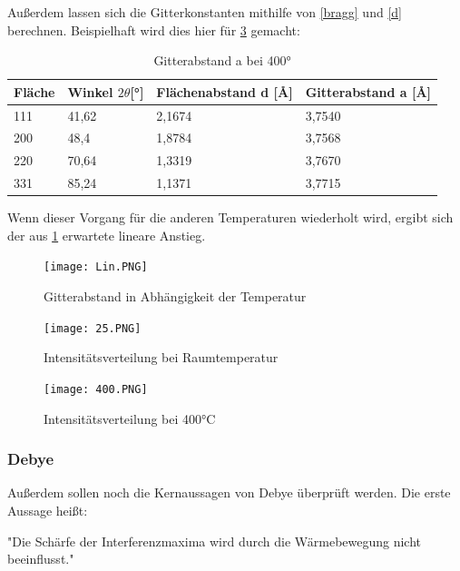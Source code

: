 \documentclass[
	a4paper,
	12pt,
	pagesize,
	ngerman
]{scrartcl}
\begin{document}
Außerdem lassen sich die Gitterkonstanten mithilfe von \cref{bragg} und \cref{d} berechnen. Beispielhaft wird dies hier für \cref{400} gemacht:
\begin{table}[h]
\caption{Gitterabstand a bei 400°}
\begin{tabular}{|l|l|l|l|}
\hline
Fläche & Winkel $2 \theta${[}°{]} & Flächenabstand d {[}\AA{]} & Gitterabstand a {[}\AA{]} \\ \hline
111    & 41,62                     & 2,1674        & 3,7540      \\ \hline
200    & 48,4                      & 1,8784        & 3,7568       \\ \hline
220    & 70,64                     & 1,3319        & 3,7670       \\ \hline
331    & 85,24                     & 1,1371         & 3,7715       \\ \hline
\end{tabular}
\end{table} 

Wenn dieser Vorgang für die anderen Temperaturen wiederholt wird, ergibt sich der aus \cref{Temp} erwartete lineare Anstieg.
\begin{figure}[h]
	\centering
	\texttt{[image: Lin.PNG]}
	\caption{Gitterabstand in Abhängigkeit der Temperatur}
	\label{Temp}
\end{figure}

\begin{figure}[h]
	\centering
	\texttt{[image: 25.PNG]}
	\caption{Intensitätsverteilung bei Raumtemperatur}
	\label{25}
\end{figure}


\begin{figure}[h]
	\centering
	\texttt{[image: 400.PNG]}
	\caption{Intensitätsverteilung bei 400°C}
	\label{400}
\end{figure}

\subsubsection{Debye}

Außerdem sollen noch die Kernaussagen von Debye überprüft werden. Die erste Aussage heißt:

"Die Schärfe der Interferenzmaxima wird durch die Wärmebewegung nicht beeinflusst."
\end{document}
